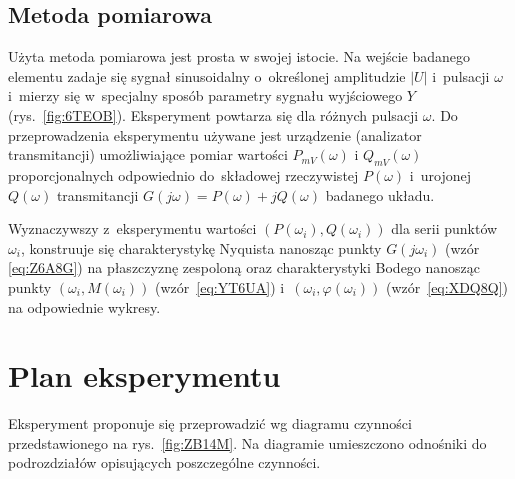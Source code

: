 \documentclass[paper=a4,DIV=12]{lpas}
\begin{document}
\begin{appendices}
  \subsection{Metoda pomiarowa}
  \label{sec:FTYRD}

  Użyta metoda pomiarowa jest prosta w swojej istocie. Na wejście badanego
  elementu zadaje się sygnał sinusoidalny o~określonej amplitudzie $|U|$
  i~pulsacji $\omega$ i~mierzy się w~specjalny sposób parametry sygnału
  wyjściowego $Y$ (rys.~\ref{fig:6TEOB}). Eksperyment powtarza się dla różnych
  pulsacji $\omega$. Do przeprowadzenia eksperymentu używane jest urządzenie
  (analizator transmitancji) umożliwiające pomiar wartości $P_{mV}(\omega)$ i
  $Q_{mV}(\omega)$ proporcjonalnych odpowiednio do~składowej rzeczywistej
  $P(\omega)$ i~urojonej $Q(\omega)$ transmitancji $G(j \omega) = P(\omega) + j
  Q(\omega)$ badanego układu.

  Wyznaczywszy z~eksperymentu wartości $(P(\omega_i), Q(\omega_i))$ dla serii
  punktów $\omega_i$, konstruuje się charakterystykę Nyquista nanosząc punkty
  $G(j\omega_i)$ (wzór \eqref{eq:Z6A8G}) na płaszczyznę zespoloną oraz
  charakterystyki Bodego nanosząc punkty $(\omega_i, M(\omega_i))$
  (wzór~\eqref{eq:YT6UA}) i~$(\omega_i, \varphi(\omega_i))$
  (wzór~\eqref{eq:XDQ8Q}) na odpowiednie wykresy.

  \section{Plan eksperymentu}
  \label{sec:0DR40}

  Eksperyment proponuje się przeprowadzić wg diagramu czynności przedstawionego
  na rys.~\ref{fig:ZB14M}. Na diagramie umieszczono odnośniki do podrozdziałów
  opisujących poszczególne czynności.
  \begin{figure}[H]
    \centering
\end{figure}
\end{appendices}
\end{document}
